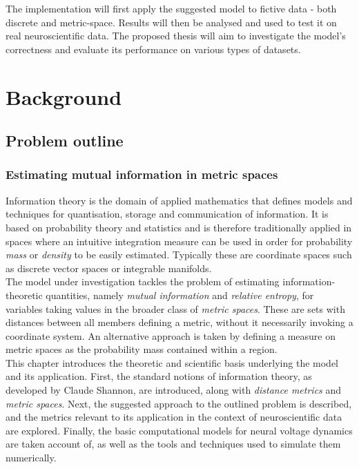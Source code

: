 \documentclass[12pt]{extarticle}
\begin{document}
\noindent
The implementation will first apply the suggested model to fictive data - both
discrete and metric-space. Results will then be analysed and used to test it on
real neuroscientific data. The proposed thesis will aim to investigate the
model's correctness and evaluate its performance on various types of
datasets.\\


\newpage
{}
\section*{Background}
\subsection*{Problem outline} 
\subsubsection*{Estimating mutual information in metric spaces}

\noindent Information theory is the domain of applied mathematics that defines models and techniques for quantisation, storage and communication of information. It is based on probability theory and statistics and is therefore traditionally applied in spaces where an intuitive integration measure can be used in order for probability \textit{mass} or \textit{density} to be easily estimated. Typically these are coordinate spaces such as discrete vector spaces or integrable manifolds.\\

\noindent The model under investigation tackles the problem of estimating information-theoretic quantities, namely \textit{mutual information} and \textit{relative entropy}, for variables taking values in the broader class of \textit{metric spaces}. These are sets with distances between all members defining a metric, without it necessarily invoking a coordinate system. An alternative approach is taken by defining a measure on metric spaces as the probability mass contained within a region.\\

\noindent This chapter introduces the theoretic and scientific basis underlying the model and its application. First, the standard notions of information theory, as developed by Claude Shannon, are introduced, along with \textit{distance metrics} and \textit{metric spaces}. Next, the suggested approach to the outlined problem is described, and the metrics relevant to its application in the context of neuroscientific data are explored. Finally, the basic computational models for neural voltage dynamics are taken account of, as well as the tools and techniques used to simulate them numerically.\\
\end{document}
